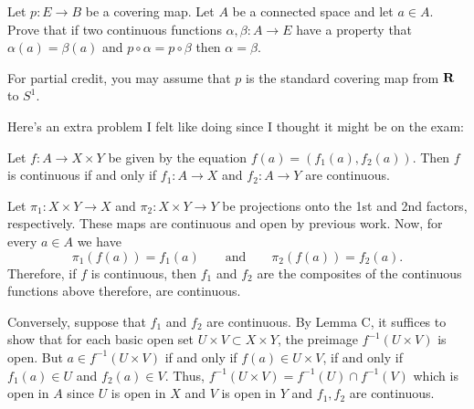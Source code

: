 \begin{problem}
  Let $p\colon E\to B$ be a covering map. Let $A$ be a connected space and
  let $a\in A$. Prove that if two continuous functions
  $\alpha,\beta\colon A\to E$ have a property that $\alpha(a)=\beta(a)$ and
  $p\circ\alpha=p\circ\beta$ then $\alpha=\beta$.

  For partial credit, you may assume that $p$ is the standard covering map
  from $\mathbf{R}$ to $S^1$.
\end{problem}
\begin{solution}
\end{solution}

Here's an extra problem I felt like doing since I thought it might be on
the exam:
\begin{problem*}
  \begin{theorem*}
    Let $f\colon A\to X\times Y$ be given by the equation
    $f(a)=(f_1(a),f_2(a))$. Then $f$ is continuous if and only if
    $f_1\colon A\to X$ and $f_2\colon A\to Y$ are continuous.
  \end{theorem*}
\end{problem*}
\begin{solution}
  Let $\pi_1\colon X\times Y\to X$ and $\pi_2\colon X\times Y\to Y$ be
  projections onto the 1st and 2nd factors, respectively. These maps are
  continuous and open by previous work. Now, for every $a\in A$ we have
  \[
    \pi_1(f(a))=f_1(a)\qquad\text{and}\qquad \pi_2(f(a))=f_2(a).
  \]
  Therefore, if $f$ is continuous, then $f_1$ and $f_2$ are the composites
  of the continuous functions above therefore, are continuous.

  Conversely, suppose that $f_1$ and $f_2$ are continuous. By Lemma C, it
  suffices to show that for each basic open set
  $U\times V\subset X\times Y$, the preimage $f^{-1}(U\times V)$ is
  open. But $a\in f^{-1}(U\times V)$ if and only if $f(a)\in U\times V$, if
  and only if $f_1(a)\in U$ and $f_2(a)\in V$. Thus,
  $f^{-1}(U\times V)=f^{-1}(U)\cap f^{-1}(V)$ which is open in $A$ since
  $U$ is open in $X$ and $V$ is open in $Y$ and $f_1,f_2$ are continuous.
\end{solution}

